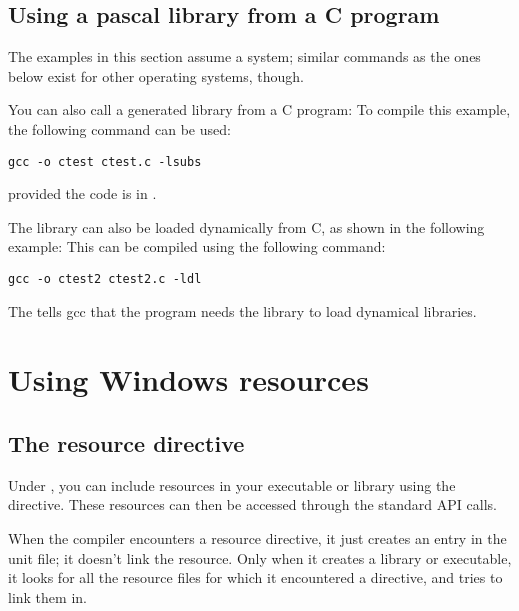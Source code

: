 {\section{Using a pascal library from a C program}

\begin{remark}The examples in this section assume a \linux system; similar commands
as the ones below exist for other operating systems, though.
\end{remark}

You can also call a \fpc generated library from a C program:
To compile this example, the following command can be used:
\begin{verbatim}
gcc -o ctest ctest.c -lsubs
\end{verbatim}
provided the code is in .

The library can also be loaded dynamically from C, as shown in the following
example:
This can be compiled using the following command:
\begin{verbatim}
gcc -o ctest2 ctest2.c -ldl
\end{verbatim}
\lstset{language=delphi}
The  tells gcc that the program needs the  library
to load dynamical libraries.


\chapter{Using Windows resources}
\label{ch:windres}

\section{The resource directive }

Under \windows, you can include resources in your executable or library
using the  directive. These resources can then
be accessed through the standard \windows API calls.

When the compiler encounters a resource directive, it just creates an
entry in the unit  file; it doesn't link the resource. Only
when it creates a library or executable, it looks for all the resource
files for which it encountered a directive, and tries to link them in.

}
